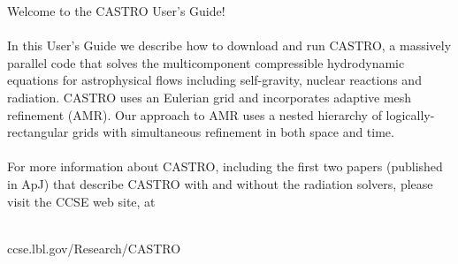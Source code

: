 Welcome to the CASTRO User's Guide!\\ \\

In this User's Guide we describe how to download and run CASTRO, a massively parallel code 
that solves the multicomponent compressible hydrodynamic equations for 
astrophysical flows including self-gravity, nuclear reactions and radiation.
CASTRO uses an Eulerian grid and incorporates adaptive mesh refinement (AMR).
Our approach to AMR uses a nested hierarchy of logically-rectangular grids with
simultaneous refinement in both space and time. \\  \\

For more information about CASTRO, including the first two papers (published in ApJ) that describe
CASTRO with and without the radiation solvers, please visit the CCSE web site, at \\ \\

\begin{center}
ccse.lbl.gov/Research/CASTRO
\end{center}
